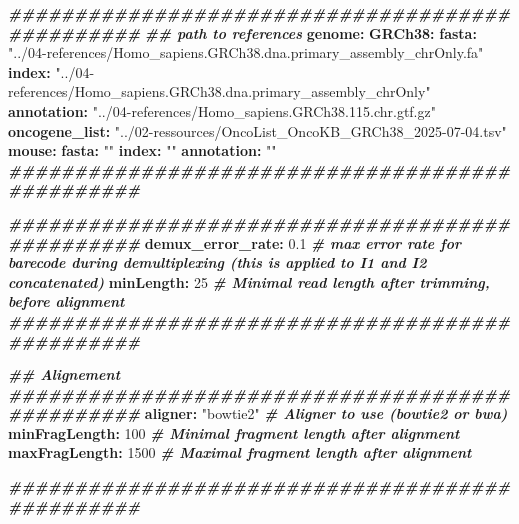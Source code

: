 \documentclass[
]{article}
\newenvironment{Shaded}{\begin{snugshade}}{\end{snugshade}}
\newcommand{\AttributeTok}[1]{\textcolor[rgb]{0.74,0.68,0.62}{#1}}
\newcommand{\CommentTok}[1]{\textcolor[rgb]{0.00,0.40,1.00}{\textbf{\textit{#1}}}}
\newcommand{\DecValTok}[1]{\textcolor[rgb]{0.27,0.67,0.26}{#1}}
\newcommand{\FloatTok}[1]{\textcolor[rgb]{0.27,0.67,0.26}{#1}}
\newcommand{\FunctionTok}[1]{\textcolor[rgb]{1.00,0.58,0.35}{\textbf{#1}}}
\newcommand{\KeywordTok}[1]{\textcolor[rgb]{0.26,0.66,0.93}{\textbf{#1}}}
\newcommand{\StringTok}[1]{\textcolor[rgb]{0.02,0.61,0.04}{#1}}
\begin{document}
\begin{Shaded}
\begin{Highlighting}[]
\CommentTok{\#\#\#\#\#\#\#\#\#\#\#\#\#\#\#\#\#\#\#\#\#\#\#\#\#\#\#\#\#\#\#\#\#\#\#\#\#\#\#\#\#\#\#\#\#\#\#\#}
\CommentTok{\#\# path to references}
\FunctionTok{genome}\KeywordTok{:}
\AttributeTok{  }\FunctionTok{GRCh38}\KeywordTok{:}
\AttributeTok{    }\FunctionTok{fasta}\KeywordTok{:}\AttributeTok{ }\StringTok{"../04{-}references/Homo\_sapiens.GRCh38.dna.primary\_assembly\_chrOnly.fa"}
\AttributeTok{    }\FunctionTok{index}\KeywordTok{:}\AttributeTok{ }\StringTok{"../04{-}references/Homo\_sapiens.GRCh38.dna.primary\_assembly\_chrOnly"}
\AttributeTok{    }\FunctionTok{annotation}\KeywordTok{:}\AttributeTok{ }\StringTok{"../04{-}references/Homo\_sapiens.GRCh38.115.chr.gtf.gz"}
\AttributeTok{    }\FunctionTok{oncogene\_list}\KeywordTok{:}\AttributeTok{ }\StringTok{"../02{-}ressources/OncoList\_OncoKB\_GRCh38\_2025{-}07{-}04.tsv"}
\AttributeTok{  }\FunctionTok{mouse}\KeywordTok{:}
\AttributeTok{    }\FunctionTok{fasta}\KeywordTok{:}\AttributeTok{ }\StringTok{""}
\AttributeTok{    }\FunctionTok{index}\KeywordTok{:}\AttributeTok{ }\StringTok{""}
\AttributeTok{    }\FunctionTok{annotation}\KeywordTok{:}\AttributeTok{ }\StringTok{""}
\CommentTok{\#\#\#\#\#\#\#\#\#\#\#\#\#\#\#\#\#\#\#\#\#\#\#\#\#\#\#\#\#\#\#\#\#\#\#\#\#\#\#\#\#\#\#\#\#\#\#\#}

\CommentTok{\#\#\#\#\#\#\#\#\#\#\#\#\#\#\#\#\#\#\#\#\#\#\#\#\#\#\#\#\#\#\#\#\#\#\#\#\#\#\#\#\#\#\#\#\#\#\#\#}
\FunctionTok{demux\_error\_rate}\KeywordTok{:}\AttributeTok{ }\FloatTok{0.1}\CommentTok{  \# max error rate for barecode during demultiplexing (this is applied to I1 and I2 concatenated)}
\FunctionTok{minLength}\KeywordTok{:}\AttributeTok{ }\DecValTok{25}\CommentTok{          \# Minimal read length after trimming, before alignment}
\CommentTok{\#\#\#\#\#\#\#\#\#\#\#\#\#\#\#\#\#\#\#\#\#\#\#\#\#\#\#\#\#\#\#\#\#\#\#\#\#\#\#\#\#\#\#\#\#\#\#\#}

\CommentTok{\#\# Alignement }
\CommentTok{\#\#\#\#\#\#\#\#\#\#\#\#\#\#\#\#\#\#\#\#\#\#\#\#\#\#\#\#\#\#\#\#\#\#\#\#\#\#\#\#\#\#\#\#\#\#\#\#}
\FunctionTok{aligner}\KeywordTok{:}\AttributeTok{ }\StringTok{"bowtie2"}\CommentTok{         \# Aligner to use (bowtie2 or bwa)}
\FunctionTok{minFragLength}\KeywordTok{:}\AttributeTok{ }\DecValTok{100}\CommentTok{         \# Minimal fragment length after alignment}
\FunctionTok{maxFragLength}\KeywordTok{:}\AttributeTok{ }\DecValTok{1500}\CommentTok{        \# Maximal fragment length after alignment }

\CommentTok{\#\#\#\#\#\#\#\#\#\#\#\#\#\#\#\#\#\#\#\#\#\#\#\#\#\#\#\#\#\#\#\#\#\#\#\#\#\#\#\#\#\#\#\#\#\#\#\#}


\end{Highlighting}
\end{Shaded}
\end{document}
